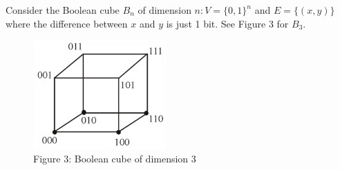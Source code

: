 \begin{problem}[30 points] Consider the Boolean cube $B_n$ of dimension $n: V=\{0,1\}^n$ and $E=\{(x,y)\}$ where the difference between $x$ and $y$ is just 1 bit. See Figure 3 for $B_3$.
\end{problem}
\begin{figure}[H]
	\centering
	\includegraphics[width=2in]{images/p2.png}\\
	Figure 3: Boolean cube of dimension 3
\end{figure} 

